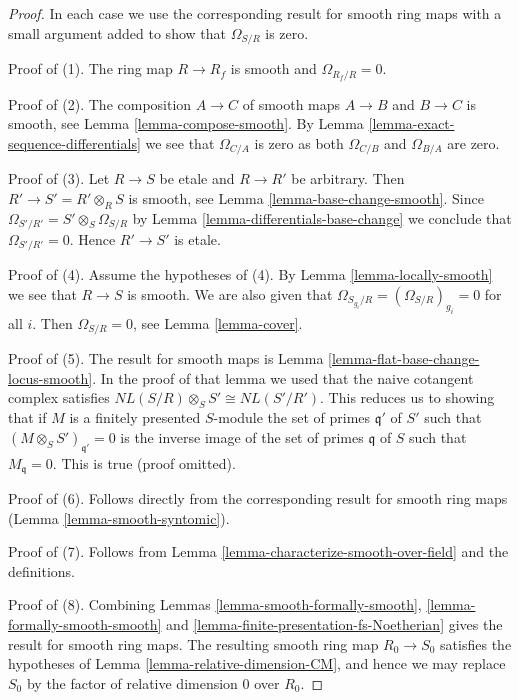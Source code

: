 \begin{proof}
In each case we use the corresponding result for smooth ring maps with
a small argument added to show that $\Omega_{S/R}$ is zero.

\medskip\noindent
Proof of (1). The ring map $R \to R_f$ is smooth and $\Omega_{R_f/R} = 0$.

\medskip\noindent
Proof of (2). The composition $A \to C$ of smooth maps $A \to B$ and
$B \to C$ is smooth, see Lemma \ref{lemma-compose-smooth}. By
Lemma \ref{lemma-exact-sequence-differentials} we see that
$\Omega_{C/A}$ is zero as both $\Omega_{C/B}$ and $\Omega_{B/A}$ are zero.

\medskip\noindent
Proof of (3). Let $R \to S$ be etale and $R \to R'$ be arbitrary.
Then $R' \to S' = R' \otimes_R S$ is smooth, see
Lemma \ref{lemma-base-change-smooth}. Since
$\Omega_{S'/R'} = S' \otimes_S \Omega_{S/R}$ by
Lemma \ref{lemma-differentials-base-change}
we conclude that $\Omega_{S'/R'} = 0$. Hence $R' \to S'$ is etale.

\medskip\noindent
Proof of (4). Assume the hypotheses of (4). By
Lemma \ref{lemma-locally-smooth} we see that $R \to S$ is smooth.
We are also given that $\Omega_{S_{g_i}/R} = (\Omega_{S/R})_{g_i} = 0$
for all $i$. Then $\Omega_{S/R} = 0$, see Lemma \ref{lemma-cover}.

\medskip\noindent
Proof of (5). The result for smooth maps is
Lemma \ref{lemma-flat-base-change-locus-smooth}.
In the proof of that lemma we used that the naive cotangent
complex satisfies $NL(S/R) \otimes_S S' \cong NL(S'/R')$.
This reduces us to showing that if $M$ is a finitely presented
$S$-module the set of primes $\mathfrak q'$ of $S'$
such that $(M\otimes_S S')_{\mathfrak q'} = 0$ is the inverse
image of the set of primes $\mathfrak q$ of $S$ such that
$M_{\mathfrak q} = 0$. This is true (proof omitted).

\medskip\noindent
Proof of (6). Follows directly from the corresponding result for
smooth ring maps (Lemma \ref{lemma-smooth-syntomic}).

\medskip\noindent
Proof of (7). Follows from Lemma \ref{lemma-characterize-smooth-over-field}
and the definitions.

\medskip\noindent
Proof of (8). Combining
Lemmas \ref{lemma-smooth-formally-smooth},
\ref{lemma-formally-smooth-smooth} and
\ref{lemma-finite-presentation-fs-Noetherian} gives the result for smooth
ring maps. The resulting smooth ring map $R_0 \to S_0$ satisfies the
hypotheses of Lemma \ref{lemma-relative-dimension-CM}, and hence we may
replace $S_0$ by the factor of relative dimension $0$ over $R_0$.
\end{proof}

